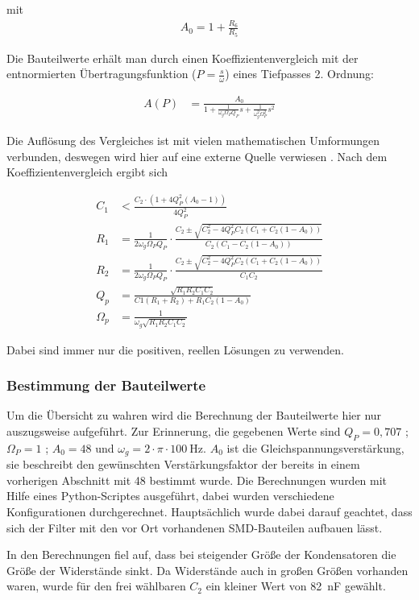mit
\begin{align*}
A_0=1+\frac{R_6}{R_5}
\end{align*}


Die Bauteilwerte erhält man durch einen Koeffizientenvergleich mit der entnormierten
Übertragungsfunktion ($P=\frac{s}{\omega}$) eines Tiefpasses 2. Ordnung:

\begin{align*}
A(P)&=\frac{A_0}{1+\frac{1}{\omega_g\Omega_PQ_P}s+\frac{1}{\omega_g^2\Omega_P^2}s^2}
\end{align*}

Die Auflösung des Vergleiches ist mit vielen mathematischen Umformungen verbunden, deswegen wird hier auf eine
externe Quelle verwiesen \cite[S. 102]{Krucker2000}.
Nach dem Koeffizientenvergleich ergibt sich

\begin{align*}
C_1&<\frac{C_2\cdot(1+4Q^2_P(A_0-1))}{4Q^2_P}\\
R_1&=\frac{1}{2\omega_g\Omega_PQ_P} \cdot \frac{C_2\pm\sqrt{C_2^2-4Q^2_PC_2(C_1+C_2(1-A_0))}}{C_2(C_1-C_2(1-A_0))}   \\
R_2&=\frac{1}{2\omega_g\Omega_PQ_P} \cdot \frac{C_2\pm\sqrt{C_2^2-4Q^2_PC_2(C_1+C_2(1-A_0))}}{C_1C_2}  \\
Q_p&=\frac{\sqrt{R_1R_2C_1C_2}}{C1(R_1+R_2)+R_1C_2(1-A_0)}\\
\Omega_p&=\frac{1}{\omega_g\sqrt{R_1R_2C_1C_2}}
\end{align*}

Dabei sind immer nur die positiven, reellen Lösungen zu verwenden.


\subsubsection{Bestimmung der Bauteilwerte}

Um die Übersicht zu wahren wird die Berechnung der Bauteilwerte hier nur auszugsweise aufgeführt. Zur Erinnerung,
die gegebenen Werte sind $Q_P=0,707$ ; $\Omega_P=1$ ; $A_0=48$ und $\omega_g = 2 \cdot \pi \cdot \SI{100}{\hertz}$.
$A_0$ ist die Gleichspannungsverstärkung, sie beschreibt den gewünschten Verstärkungsfaktor der bereits in einem vorherigen
Abschnitt mit 48 bestimmt wurde. Die Berechnungen wurden mit Hilfe eines Python-Scriptes ausgeführt, dabei wurden verschiedene
Konfigurationen durchgerechnet. Hauptsächlich wurde dabei darauf geachtet, dass sich der Filter mit den vor Ort vorhandenen SMD-Bauteilen
aufbauen lässt.

In den Berechnungen fiel auf, dass bei steigender Größe der Kondensatoren die Größe der Widerstände sinkt. Da Widerstände auch in großen Größen vorhanden waren,
wurde für den frei wählbaren $C_2$ ein kleiner Wert von \SI{82}{\nano\farad} gewählt.

